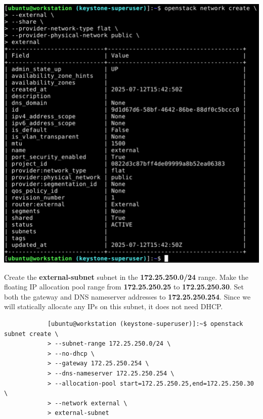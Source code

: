 \documentclass[letterpaper, 12pt]{article}
\begin{document}
\begin{enumerate}
\begin{labstep}
        \begin{center}
            \includegraphics[width=\linewidth]{images/part1/step23.png}
        \end{center}
    \end{labstep}

    \begin{labstep}
        Create the \textbf{external-subnet} subnet in the \textbf{172.25.250.0/24} range.
        Make the floating IP allocation pool range from \textbf{172.25.250.25} to \textbf{172.25.250.30}.
        Set both the gateway and DNS nameserver addresses to \textbf{172.25.250.254}.
        Since we will statically allocate any IPs on this subnet, it does not need DHCP.
        \begin{lstlisting}
            [ubuntu@workstation (keystone-superuser)]:~$ openstack subnet create \
            > --subnet-range 172.25.250.0/24 \
            > --no-dhcp \
            > --gateway 172.25.250.254 \
            > --dns-nameserver 172.25.250.254 \
            > --allocation-pool start=172.25.250.25,end=172.25.250.30 \
            > --network external \
            > external-subnet
        \end{lstlisting}


\end{labstep}
\end{enumerate}
\end{document}
